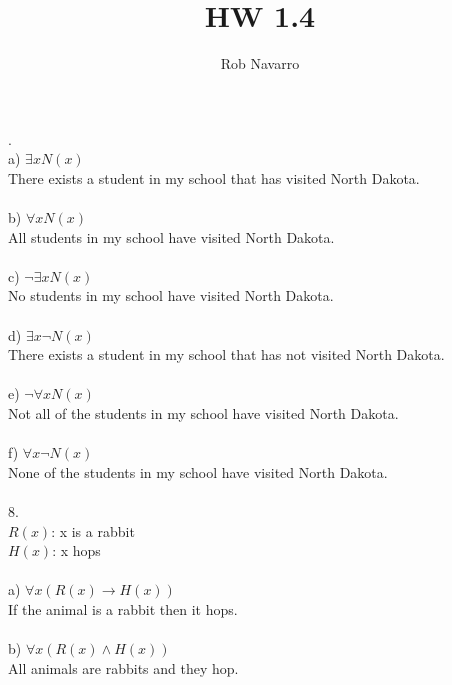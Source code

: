 \documentclass[11pt, oneside]{article}   	%
\title{HW 1.4}
\author{Rob Navarro}
\begin{document}
\maketitle

.\\ 
\indent a) $\exists xN(x)$ \\
\indent There exists a student in my school that has visited North Dakota. \\\\
\indent b) $\forall xN(x)$\\
\indent All students in my school have visited North Dakota. \\\\
\indent c) $\neg\exists xN(x)$ \\
\indent No students in my school have visited North Dakota. \\\\
\indent d) $\exists x\neg N(x)$ \\
\indent There exists a student in my school that has not visited North Dakota. \\\\
\indent e) $\neg\forall xN(x)$\\
\indent Not all of the students in my school have visited North Dakota. \\\\
\indent f) $\forall x \neg N(x)$\\
\indent None of the students in my school have visited North Dakota. \\\\
8. \\
$R(x)$: x is a rabbit\\ $H(x)$: x hops\\\\
\indent a) $\forall x(R(x) \to H(x))$\\
\indent If the animal is a rabbit then it hops.\\\\
\indent b) $\forall x(R(x) \wedge H(x))$\\
\indent All animals are rabbits and they hop. \\\\
\end{document}

